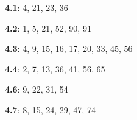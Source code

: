 \documentclass{siproblemset}
\begin{document}
        \textbf{4.1}: 4, 21, 23, 36
        
        \textbf{4.2}: 1, 5, 21, 52, 90, 91
        
        \textbf{4.3}: 4, 9, 15, 16, 17, 20, 33, 45, 56
        
        \textbf{4.4}: 2, 7, 13, 36, 41, 56, 65
        
        \textbf{4.6}: 9, 22, 31, 54
        
        \textbf{4.7}: 8, 15, 24, 29, 47, 74
%        
%        
%        
%        
%        
%        
%        
%        
%        
%        
    
\end{document}
